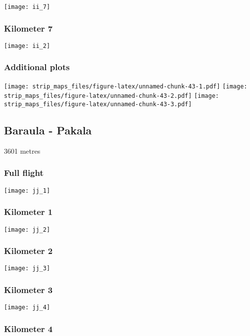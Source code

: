 \documentclass[]{article}
\begin{document}
\texttt{[image: ii\_7]}

\subsubsection{Kilometer 7}\label{kilometer-7-18}

\texttt{[image: ii\_2]}

\subsubsection{Additional plots}\label{additional-plots-34}

\texttt{[image: strip\_maps\_files/figure-latex/unnamed-chunk-43-1.pdf]}
\texttt{[image: strip\_maps\_files/figure-latex/unnamed-chunk-43-2.pdf]}
\texttt{[image: strip\_maps\_files/figure-latex/unnamed-chunk-43-3.pdf]}

\newpage

\subsection{Baraula - Pakala}\label{baraula---pakala}

3601 metres

\subsubsection{Full flight}\label{full-flight-35}

\texttt{[image: jj\_1]}

\subsubsection{Kilometer 1}\label{kilometer-1-35}

\texttt{[image: jj\_2]}

\subsubsection{Kilometer 2}\label{kilometer-2-35}

\texttt{[image: jj\_3]}

\subsubsection{Kilometer 3}\label{kilometer-3-35}

\texttt{[image: jj\_4]}

\subsubsection{Kilometer 4}\label{kilometer-4-34}
\end{document}
